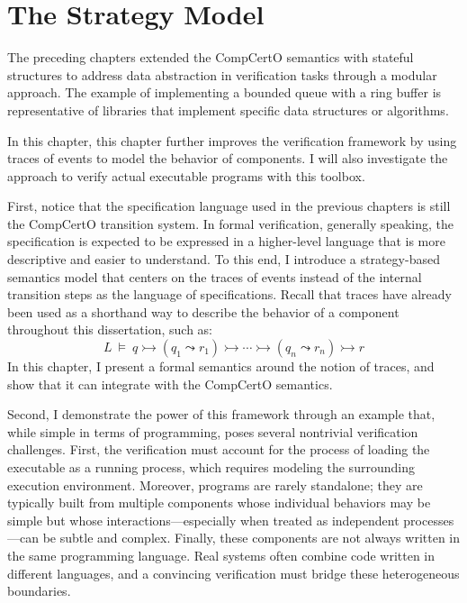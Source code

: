 \chapter{The Strategy Model}
\label{ch:strat}

The preceding chapters
extended the CompCertO semantics
with stateful structures
to address data abstraction in verification tasks
through a modular approach.
The example of implementing a bounded queue with a ring buffer
is representative of
libraries that implement
specific data structures or algorithms.

In this chapter,
this chapter further improves the verification framework
by using traces of events
to model the behavior of components.
I will also investigate the approach to
verify actual executable programs
with this toolbox.

First,
notice that the specification language used in the previous chapters
is still the CompCertO transition system.
In formal verification,
generally speaking,
the specification is expected to be expressed
in a higher-level language that is more descriptive
and easier to understand.
To this end,
I introduce a strategy-based semantics model
that centers on the traces of events
instead of the internal transition steps
as the language of specifications.
Recall that
traces have already been used as a shorthand way
to describe the behavior of a component
throughout this dissertation,
such as:
\[
  L \:\vDash\: q \rightarrowtail
  (q_1 \leadsto r_1) \rightarrowtail
  \cdots \rightarrowtail
  (q_n \leadsto r_n) \rightarrowtail
  r
\]
In this chapter,
I present a formal semantics around the notion of traces,
and show that
it can integrate with the CompCertO semantics.

Second,
I demonstrate the power of this framework
through an example that,
while simple in terms of programming,
poses several nontrivial verification challenges.
First, the verification must account for
the process of loading the executable
as a running process,
which requires modeling the surrounding execution environment.
Moreover, programs are rarely standalone;
they are typically built from multiple components
whose individual behaviors may be simple
but whose interactions---especially
when treated as independent processes---can be subtle
and complex.
Finally, these components are not always written
in the same programming language.
Real systems often combine code written
in different languages,
and a convincing verification
must bridge these heterogeneous boundaries.

